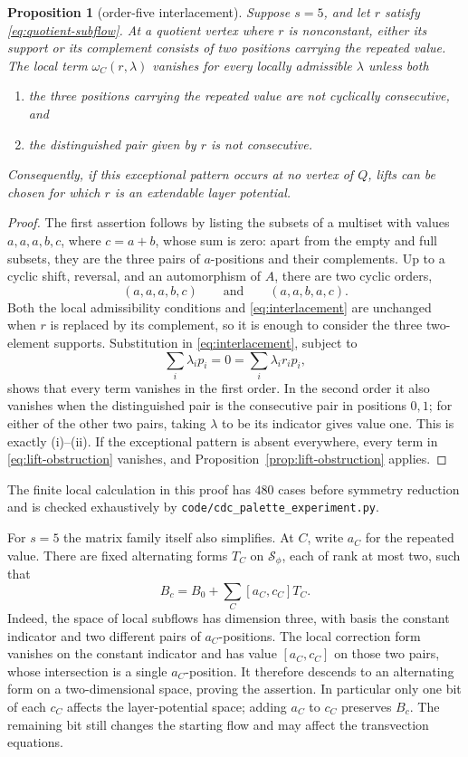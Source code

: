 \documentclass[11pt,a4paper]{article}
\newtheorem{proposition}[theorem]{Proposition}
\theoremstyle{definition}
\theoremstyle{remark}
\begin{document}
\begin{proposition}[order-five interlacement]\label{prop:order-five-interlacement}
Suppose $s=5$, and let $r$ satisfy \eqref{eq:quotient-subflow}.  At a quotient vertex where $r$ is nonconstant, either its support or its complement consists of two positions carrying the repeated value.  The local term $\omega_C(r,\lambda)$ vanishes for every locally admissible $\lambda$ unless both
\begin{enumerate}[label=\textup{(\roman*)}]
\item the three positions carrying the repeated value are not cyclically consecutive, and
\item the distinguished pair given by $r$ is not consecutive.
\end{enumerate}
Consequently, if this exceptional pattern occurs at no vertex of $Q$, lifts can be chosen for which $r$ is an extendable layer potential.
\end{proposition}
\begin{proof}
The first assertion follows by listing the subsets of a multiset with values $a,a,a,b,c$, where $c=a+b$, whose sum is zero: apart from the empty and full subsets, they are the three pairs of $a$-positions and their complements.  Up to a cyclic shift, reversal, and an automorphism of $A$, there are two cyclic orders,
\[
 (a,a,a,b,c)\qquad\text{and}\qquad(a,a,b,a,c).
\]
Both the local admissibility conditions and \eqref{eq:interlacement} are unchanged when $r$ is replaced by its complement, so it is enough to consider the three two-element supports.  Substitution in \eqref{eq:interlacement}, subject to
\[
 \sum_i\lambda_i p_i=0=\sum_i\lambda_i r_i p_i,
\]
shows that every term vanishes in the first order.  In the second order it also vanishes when the distinguished pair is the consecutive pair in positions $0,1$; for either of the other two pairs, taking $\lambda$ to be its indicator gives value one.  This is exactly (i)--(ii).  If the exceptional pattern is absent everywhere, every term in \eqref{eq:lift-obstruction} vanishes, and Proposition~\ref{prop:lift-obstruction} applies.
\end{proof}

The finite local calculation in this proof has $480$ cases before symmetry reduction and is checked exhaustively by \nolinkurl{code/cdc_palette_experiment.py}.

For $s=5$ the matrix family itself also simplifies.  At $C$, write $a_C$ for the repeated value.  There are fixed alternating forms $T_C$ on $\mathcal S_\phi$, each of rank at most two, such that
\[
 B_c=B_0+\sum_C[a_C,c_C]T_C.
\]
Indeed, the space of local subflows has dimension three, with basis the constant indicator and two different pairs of $a_C$-positions.  The local correction form vanishes on the constant indicator and has value $[a_C,c_C]$ on those two pairs, whose intersection is a single $a_C$-position.  It therefore descends to an alternating form on a two-dimensional space, proving the assertion.  In particular only one bit of each $c_C$ affects the layer-potential space; adding $a_C$ to $c_C$ preserves $B_c$.  The remaining bit still changes the starting flow and may affect the transvection equations.
\end{document}
